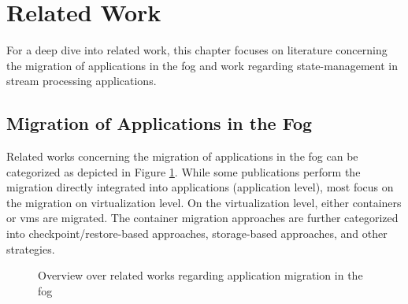 \section{Related Work}
\label{lRelatedWork}
For a deep dive into related work, this chapter focuses on literature concerning the migration of applications in the fog and work regarding state-management in stream processing applications.

\subsection{Migration of Applications in the Fog}
\label{lMigrationInTheFog}
Related works concerning the migration of applications in the fog can be categorized as depicted in Figure \ref{fOverviewLiteratureFog}. While some publications perform the migration directly integrated into applications (application level), most focus on the migration on virtualization level. On the virtualization level, either containers or \gls{vm}s are migrated. The container migration approaches are further categorized into checkpoint/restore-based approaches, storage-based approaches, and other strategies.

\begin{figure}[H]
\graphicspath{{./figures/code/}}

\caption{Overview over related works regarding application migration in the fog}
\label{fOverviewLiteratureFog}
\end{figure}


